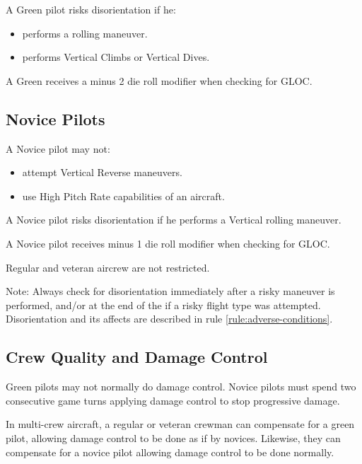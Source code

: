 \begin{advancedrules}
    A Green pilot risks disorientation if he:
    \begin{itemize}
        \item performs a rolling maneuver.
        \item performs Vertical Climbs or Vertical Dives.
    \end{itemize}

    A Green  receives a minus 2 die roll modifier when checking for GLOC.

    \subsection{Novice Pilots} A Novice pilot may not:

    \begin{itemize}
        \item attempt Vertical Reverse maneuvers.
        \item use High Pitch Rate capabilities of an aircraft.
    \end{itemize}

    A Novice pilot risks disorientation if he performs a Vertical rolling maneuver.

    A Novice pilot receives minus 1 die roll modifier when checking for GLOC.

    Regular and veteran aircrew are not restricted.

    Note: Always check for disorientation immediately after a risky maneuver is performed, and/or at the end of the  if a risky flight type was attempted. Disorientation and its affects are described in rule \ref{rule:adverse-conditions}.

    \subsection{Crew Quality and Damage Control} Green pilots may not normally do damage control. Novice pilots must spend two consecutive game turns applying damage control to stop progressive damage.

    In multi-crew aircraft, a regular or veteran crewman can compensate for a green pilot, allowing damage control to be done as if by novices. Likewise, they can compensate for a novice pilot allowing damage control to be done normally.


\end{advancedrules}
